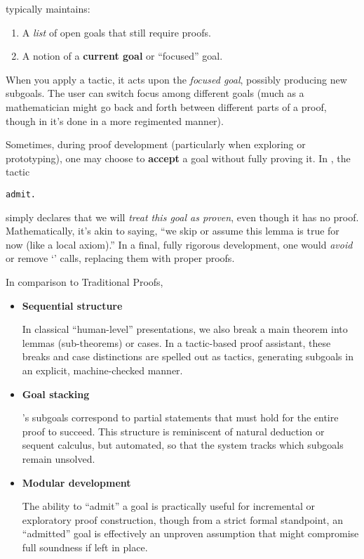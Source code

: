 \newpage
\EasyCrypt typically maintains:
\begin{enumerate}
	\item A \textit{list} of open goals that still require proofs.  
	\item A notion of a \textbf{current goal} or ``focused'' goal. 
\end{enumerate} 
When you apply a tactic, it acts upon the \textit{focused goal}, possibly producing new subgoals. The user can switch focus among different goals (much as a mathematician might go back and forth between different parts of a proof, though in \EasyCrypt it’s done in a more regimented manner).

Sometimes, during proof development (particularly when exploring or prototyping), one may choose to \textbf{accept} a goal without fully proving it. In \EasyCrypt, the tactic
\begin{lstlisting}[style=easycrypt]
admit.
\end{lstlisting}
simply declares that we will \textit{treat this goal as proven}, even though it has no proof. Mathematically, it’s akin to saying, ``we skip or assume this lemma is true for now (like a local axiom).'' In a final, fully rigorous development, one would \textit{avoid} or remove `' calls, replacing them with proper proofs.

In comparison to Traditional Proofs,
\begin{itemize}
	\item \textbf{Sequential structure}
	
	In classical ``human-level'' presentations, we also break a main theorem into lemmas (sub-theorems) or cases. In a tactic-based proof assistant, these breaks and case distinctions are spelled out as tactics, generating subgoals in an explicit, machine-checked manner.  
	\item \textbf{Goal stacking}
	
	\EasyCrypt’s subgoals correspond to partial statements that must hold for the entire proof to succeed. This structure is reminiscent of natural deduction or sequent calculus, but automated, so that the system tracks which subgoals remain unsolved.  
	\item \textbf{Modular development}
	
	The ability to ``admit'' a goal is practically useful for incremental or exploratory proof construction, though from a strict formal standpoint, an ``admitted'' goal is effectively an unproven assumption that might compromise full soundness if left in place.
\end{itemize}

